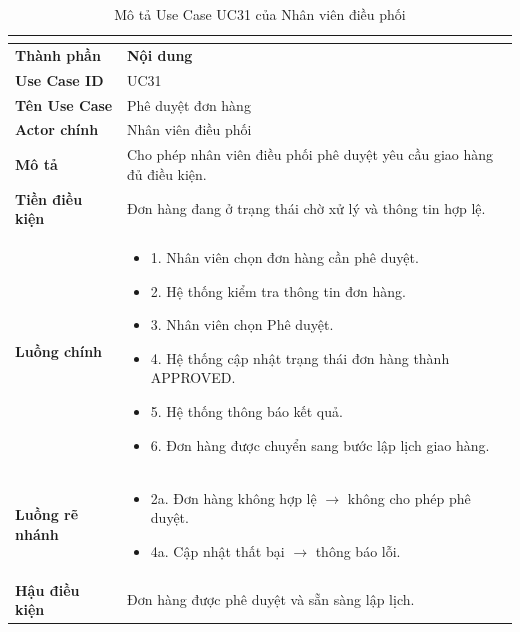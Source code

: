 \begin{longtable}{|C{3cm}|L{11cm}|}
\caption{Mô tả Use Case UC31 của Nhân viên điều phối}\\
\label{tab:mo-ta-uc31-dieu-phoi}\\
\hline
\textbf{Thành phần} & \textbf{Nội dung} \\
\hline
\textbf{Use Case ID} & UC31 \\
\hline
\textbf{Tên Use Case} & Phê duyệt đơn hàng \\
\hline
\textbf{Actor chính} & Nhân viên điều phối \\
\hline
\textbf{Mô tả} &
Cho phép nhân viên điều phối phê duyệt yêu cầu giao hàng đủ điều kiện. \\
\hline
\textbf{Tiền điều kiện} &
Đơn hàng đang ở trạng thái chờ xử lý và thông tin hợp lệ. \\
\hline
\textbf{Luồng chính} &
\begin{itemize}[leftmargin=*,topsep=2pt,itemsep=2pt]
    \item 1. Nhân viên chọn đơn hàng cần phê duyệt.
    \item 2. Hệ thống kiểm tra thông tin đơn hàng.
    \item 3. Nhân viên chọn Phê duyệt.
    \item 4. Hệ thống cập nhật trạng thái đơn hàng thành APPROVED.
    \item 5. Hệ thống thông báo kết quả.
    \item 6. Đơn hàng được chuyển sang bước lập lịch giao hàng.
\end{itemize} \\
\hline
\textbf{Luồng rẽ nhánh} &
\begin{itemize}[leftmargin=*,topsep=2pt,itemsep=2pt]
    \item 2a. Đơn hàng không hợp lệ $\rightarrow$ không cho phép phê duyệt.
    \item 4a. Cập nhật thất bại $\rightarrow$ thông báo lỗi.
\end{itemize} \\
\hline
\textbf{Hậu điều kiện} &
Đơn hàng được phê duyệt và sẵn sàng lập lịch. \\
\hline
\end{longtable}


